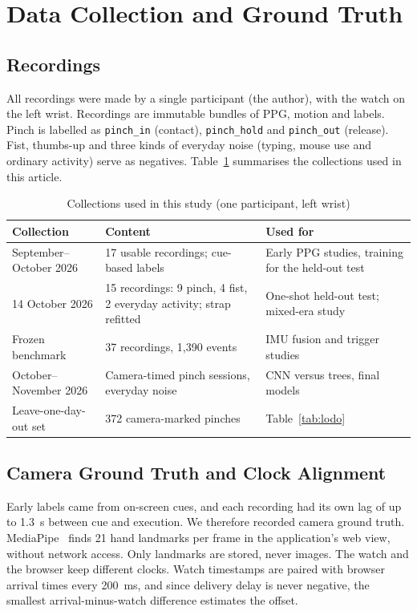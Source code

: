 \section{Data Collection and Ground Truth}\label{sec:data}

\subsection{Recordings}

All recordings were made by a single participant (the author), with the watch on the left wrist. Recordings are immutable bundles of PPG, motion and labels. Pinch is labelled as \texttt{pinch\_in} (contact), \texttt{pinch\_hold} and \texttt{pinch\_out} (release). Fist, thumbs-up and three kinds of everyday noise (typing, mouse use and ordinary activity) serve as negatives. Table~\ref{tab:data} summarises the collections used in this article.

\begin{table}[t]
  \centering
  \caption{Collections used in this study (one participant, left wrist)}
  \label{tab:data}
  \small
  \begin{tabular}{@{}p{}p{}p{}@{}}
    \toprule
    Collection & Content & Used for \\
    \midrule
    September--October 2026 & 17 usable recordings; cue-based labels & Early PPG studies, training for the held-out test \\
    14 October 2026 & 15 recordings: 9 pinch, 4 fist, 2 everyday activity; strap refitted & One-shot held-out test; mixed-era study \\
    Frozen benchmark & 37 recordings, 1{,}390 events & IMU fusion and trigger studies \\
    October--November 2026 & Camera-timed pinch sessions, everyday noise & CNN versus trees, final models \\
    Leave-one-day-out set & 372 camera-marked pinches & Table~\ref{tab:lodo} \\
    \bottomrule
  \end{tabular}
\end{table}

\subsection{Camera Ground Truth and Clock Alignment}

Early labels came from on-screen cues, and each recording had its own lag of up to 1.3~s between cue and execution. We therefore recorded camera ground truth. MediaPipe~\cite{mediapipe} finds 21 hand landmarks per frame in the application's web view, without network access. Only landmarks are stored, never images. The watch and the browser keep different clocks. Watch timestamps are paired with browser arrival times every 200~ms, and since delivery delay is never negative, the smallest arrival-minus-watch difference estimates the offset.

